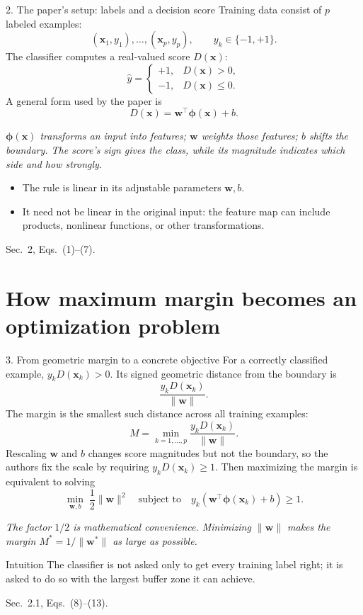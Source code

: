 \documentclass[10pt,compress]{beamer}
\newcommand{\norm}[1]{\lVert #1\rVert}
\newcommand{\x}{\bm{x}}
\newcommand{\w}{\bm{w}}
\newcommand{\phiX}{\bm{\phi}}
\newcommand{\defline}[1]{{\footnotesize\textcolor{aggiemaroon}{\textit{#1}}\par}}
\begin{document}
\begin{frame}{2. The paper's setup: labels and a decision score}
Training data consist of $p$ labeled examples:
\[
(\x_1,y_1),\ldots,(\x_p,y_p), \qquad y_k\in\{-1,+1\}.
\]
The classifier computes a real-valued score $D(\x)$:
\[
\widehat y =
\begin{cases}
+1,&D(\x)>0,\\
-1,&D(\x)\leq 0.
\end{cases}
\]
A general form used by the paper is
\[
D(\x)=\w^\top\phiX(\x)+b.
\]
\defline{$\phiX(\x)$ transforms an input into features; $\w$ weights those features; $b$ shifts the boundary. The score's sign gives the class, while its magnitude indicates which side and how strongly.}
\begin{itemize}\small
\item The rule is linear in its adjustable parameters $\w,b$.
\item It need not be linear in the original input: the feature map can include products, nonlinear functions, or other transformations.
\end{itemize}
{\scriptsize Sec.~2, Eqs.~(1)--(7).}
\end{frame}

\section[Optimization]{How maximum margin becomes an optimization problem}
\begin{frame}{3. From geometric margin to a concrete objective}\footnotesize
For a correctly classified example, $y_kD(\x_k)>0$. Its signed geometric distance from the boundary is
\[
\frac{y_kD(\x_k)}{\norm{\w}}.
\]
The margin is the smallest such distance across all training examples:
\[
M=\min_{k=1,\ldots,p}\frac{y_kD(\x_k)}{\norm{\w}}.
\]
Rescaling $\w$ and $b$ changes score magnitudes but not the boundary, so the authors fix the scale by requiring $y_kD(\x_k)\geq 1$. Then maximizing the margin is equivalent to solving
\[
\boxed{\min_{\w,b}\;\frac12\norm{\w}^{2}
\quad\text{subject to}\quad
y_k(\w^\top\phiX(\x_k)+b)\geq 1.}
\]
\defline{The factor $1/2$ is mathematical convenience. Minimizing $\norm{\w}$ makes the margin $M^*=1/\norm{\w^*}$ as large as possible.}
\begin{block}{Intuition}
\small The classifier is not asked only to get every training label right; it is asked to do so with the largest buffer zone it can achieve.
\end{block}
{\scriptsize Sec.~2.1, Eqs.~(8)--(13).}
\end{frame}
\end{document}
